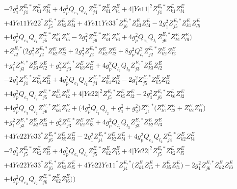 \begin{align}
 &-2 g_{1}^{2} Z^{E,*}_{j 4} Z_{{k 1}}^{E} Z_{{l 4}}^{E} +4 g_{p}^{2} Q_{e_{1}} Q_{l_1} Z^{E,*}_{j 4} Z_{{k 1}}^{E} Z_{{l 4}}^{E} +4 |Ye11|^2 Z^{E,*}_{j 4} Z_{{k 1}}^{E} Z_{{l 4}}^{E} \nonumber \\ 
 &+4 Ye11 Ye22^* Z^{E,*}_{j 5} Z_{{k 2}}^{E} Z_{{l 4}}^{E} +4 Ye11 Ye33^* Z^{E,*}_{j 6} Z_{{k 3}}^{E} Z_{{l 4}}^{E} -2 g_{1}^{2} Z^{E,*}_{j 5} Z_{{k 1}}^{E} Z_{{l 5}}^{E} \nonumber \\ 
 &+4 g_{p}^{2} Q_{e_{2}} Q_{l_1} Z^{E,*}_{j 5} Z_{{k 1}}^{E} Z_{{l 5}}^{E} -2 g_{1}^{2} Z^{E,*}_{j 6} Z_{{k 1}}^{E} Z_{{l 6}}^{E} +4 g_{p}^{2} Q_{e_3} Q_{l_1} Z^{E,*}_{j 6} Z_{{k 1}}^{E} Z_{{l 6}}^{E} \Big)\nonumber \\ 
 &+Z^{E,*}_{i 2} \Big(2 g_{1}^{2} Z^{E,*}_{j 2} Z_{{k 2}}^{E} Z_{{l 2}}^{E} +2 g_{2}^{2} Z^{E,*}_{j 2} Z_{{k 2}}^{E} Z_{{l 2}}^{E} +8 g_{p}^{2} Q_{l_2}^{2} Z^{E,*}_{j 2} Z_{{k 2}}^{E} Z_{{l 2}}^{E} \nonumber \\ 
 &+g_{1}^{2} Z^{E,*}_{j 3} Z_{{k 3}}^{E} Z_{{l 2}}^{E} +g_{2}^{2} Z^{E,*}_{j 3} Z_{{k 3}}^{E} Z_{{l 2}}^{E} +4 g_{p}^{2} Q_{l_2} Q_{l_3} Z^{E,*}_{j 3} Z_{{k 3}}^{E} Z_{{l 2}}^{E} \nonumber \\ 
 &-2 g_{1}^{2} Z^{E,*}_{j 4} Z_{{k 4}}^{E} Z_{{l 2}}^{E} +4 g_{p}^{2} Q_{e_{1}} Q_{l_2} Z^{E,*}_{j 4} Z_{{k 4}}^{E} Z_{{l 2}}^{E} -2 g_{1}^{2} Z^{E,*}_{j 5} Z_{{k 5}}^{E} Z_{{l 2}}^{E} \nonumber \\ 
 &+4 g_{p}^{2} Q_{e_{2}} Q_{l_2} Z^{E,*}_{j 5} Z_{{k 5}}^{E} Z_{{l 2}}^{E} +4 |Ye22|^2 Z^{E,*}_{j 5} Z_{{k 5}}^{E} Z_{{l 2}}^{E} -2 g_{1}^{2} Z^{E,*}_{j 6} Z_{{k 6}}^{E} Z_{{l 2}}^{E} \nonumber \\ 
 &+4 g_{p}^{2} Q_{e_3} Q_{l_2} Z^{E,*}_{j 6} Z_{{k 6}}^{E} Z_{{l 2}}^{E} +\Big(4 g_{p}^{2} Q_{l_1} Q_{l_2}  + g_{1}^{2} + g_{2}^{2}\Big)Z^{E,*}_{j 1} \Big(Z_{{k 1}}^{E} Z_{{l 2}}^{E}  + Z_{{k 2}}^{E} Z_{{l 1}}^{E} \Big)\nonumber \\ 
 &+g_{1}^{2} Z^{E,*}_{j 3} Z_{{k 2}}^{E} Z_{{l 3}}^{E} +g_{2}^{2} Z^{E,*}_{j 3} Z_{{k 2}}^{E} Z_{{l 3}}^{E} +4 g_{p}^{2} Q_{l_2} Q_{l_3} Z^{E,*}_{j 3} Z_{{k 2}}^{E} Z_{{l 3}}^{E} \nonumber \\ 
 &+4 Ye22 Ye33^* Z^{E,*}_{j 6} Z_{{k 5}}^{E} Z_{{l 3}}^{E} -2 g_{1}^{2} Z^{E,*}_{j 4} Z_{{k 2}}^{E} Z_{{l 4}}^{E} +4 g_{p}^{2} Q_{e_{1}} Q_{l_2} Z^{E,*}_{j 4} Z_{{k 2}}^{E} Z_{{l 4}}^{E} \nonumber \\ 
 &-2 g_{1}^{2} Z^{E,*}_{j 5} Z_{{k 2}}^{E} Z_{{l 5}}^{E} +4 g_{p}^{2} Q_{e_{2}} Q_{l_2} Z^{E,*}_{j 5} Z_{{k 2}}^{E} Z_{{l 5}}^{E} +4 |Ye22|^2 Z^{E,*}_{j 5} Z_{{k 2}}^{E} Z_{{l 5}}^{E} \nonumber \\ 
 &+4 Ye22 Ye33^* Z^{E,*}_{j 6} Z_{{k 3}}^{E} Z_{{l 5}}^{E} +4 Ye22 Ye11^* Z^{E,*}_{j 4} \Big(Z_{{k 1}}^{E} Z_{{l 5}}^{E}  + Z_{{k 5}}^{E} Z_{{l 1}}^{E} \Big)-2 g_{1}^{2} Z^{E,*}_{j 6} Z_{{k 2}}^{E} Z_{{l 6}}^{E} \nonumber \\ 
 &+4 g_{p}^{2} Q_{e_3} Q_{l_2} Z^{E,*}_{j 6} Z_{{k 2}}^{E} Z_{{l 6}}^{E} \Big)\Big)\end{align} 
